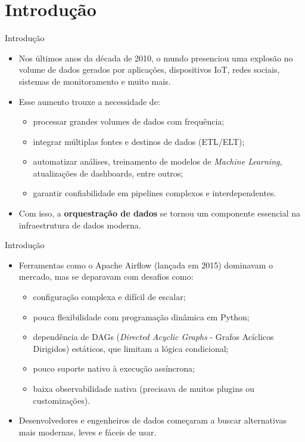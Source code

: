 \documentclass[t,serif]{beamer}
\begin{document}
\section{Introdução}
	\begin{frame}{Introdução}
		\begin{itemize}
			\item Nos últimos anos da década de 2010, o mundo presenciou uma explosão no volume de dados gerados por aplicações, dispositivos IoT, redes sociais, sistemas de monitoramento e muito mais.
			\vspace{0.5cm}
			\item Esse aumento trouxe a necessidade de:
			\begin{itemize}
				\item processar grandes volumes de dados com frequência;
				\item integrar múltiplas fontes e destinos de dados (ETL/ELT);
				\item automatizar análises, treinamento de modelos de \textit{Machine Learning}, atualizações de dashboards, entre outros;
				\item garantir confiabilidade em pipelines complexos e interdependentes.
			\end{itemize}
			\vspace{0.5cm}
			\item Com isso, a \textbf{orquestração de dados} se tornou um componente essencial na infraestrutura de dados moderna.
		\end{itemize}
	\end{frame}
	
	\begin{frame}{Introdução}
		\vspace{0.5cm}
		\begin{itemize}
			\item Ferramentas como o Apache Airflow (lançada em 2015) dominavam o mercado, mas se deparavam com desafios como:
			\begin{itemize}
				\item configuração complexa e difícil de escalar;
				\item pouca flexibilidade com programação dinâmica em Python;
				\item dependência de DAGs (\textit{Directed Acyclic Graphs} - Grafos Acíclicos Dirigidos) estáticos, que limitam a lógica condicional;
				\item pouco suporte nativo à execução assíncrona;
				\item baixa observabilidade nativa (precisava de muitos plugins ou customizações).
			\end{itemize}
			\vspace{0.5cm}
			\item Desenvolvedores e engenheiros de dados começaram a buscar alternativas mais modernas, leves e fáceis de usar.
		\end{itemize}
	\end{frame}
	
\end{document}
